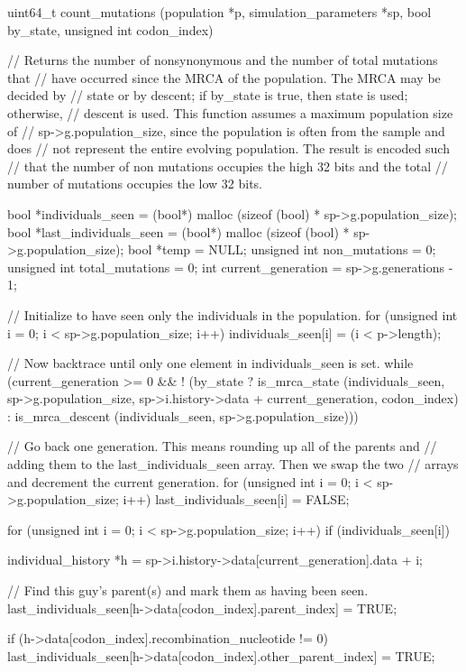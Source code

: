 \documentclass{article}
\begin{document}
\begin{ccode}
uint64_t count_mutations (population *p, simulation_parameters *sp, bool by_state,
			  unsigned int codon_index) {
  // Returns the number of nonsynonymous and the number of total mutations that
  // have occurred since the MRCA of the population. The MRCA may be decided by
  // state or by descent; if by_state is true, then state is used; otherwise,
  // descent is used. This function assumes a maximum population size of
  // sp->g.population_size, since the population is often from the sample and does
  // not represent the entire evolving population. The result is encoded such
  // that the number of non mutations occupies the high 32 bits and the total
  // number of mutations occupies the low 32 bits.

  bool       	*individuals_seen 	= (bool*) malloc (sizeof (bool) * sp->g.population_size);
  bool       	*last_individuals_seen	= (bool*) malloc (sizeof (bool) * sp->g.population_size);
  bool       	*temp			= NULL;
  unsigned int	non_mutations		= 0;
  unsigned int	total_mutations		= 0;
  int		current_generation	= sp->g.generations - 1;

  // Initialize to have seen only the individuals in the population.
  for (unsigned int i = 0; i < sp->g.population_size; i++)
    individuals_seen[i] = (i < p->length);

  // Now backtrace until only one element in individuals_seen is set.
  while (current_generation >= 0 &&
        ! (by_state ?
            is_mrca_state (individuals_seen, sp->g.population_size,
			   sp->i.history->data + current_generation, codon_index) :
            is_mrca_descent (individuals_seen, sp->g.population_size))) {

    // Go back one generation. This means rounding up all of the parents and
    // adding them to the last_individuals_seen array. Then we swap the two
    // arrays and decrement the current generation.
    for (unsigned int i = 0; i < sp->g.population_size; i++)
      last_individuals_seen[i] = FALSE;

    for (unsigned int i = 0; i < sp->g.population_size; i++)
      if (individuals_seen[i]) {
        individual_history *h = sp->i.history->data[current_generation].data + i;

        // Find this guy's parent(s) and mark them as having been seen.
        last_individuals_seen[h->data[codon_index].parent_index] = TRUE;

        if (h->data[codon_index].recombination_nucleotide != 0)
          last_individuals_seen[h->data[codon_index].other_parent_index] = TRUE;

}}}
\end{ccode}
\end{document}
